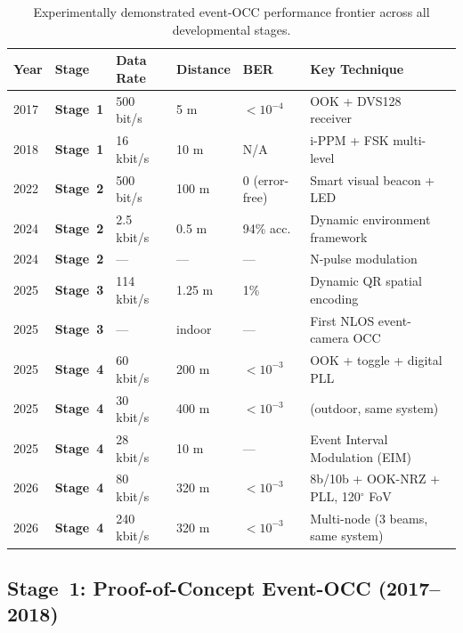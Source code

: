 \documentclass[10pt,a4paper]{article}
\newcommand{\stage}[1]{\textbf{Stage~#1}}
\begin{document}
\begin{table}[t]
\centering
\caption{Experimentally demonstrated event-OCC performance frontier across all developmental stages.}
\label{tab:frontier}
\small
\begin{tabularx}{\textwidth}{l l l l l X}
\toprule
\textbf{Year} & \textbf{Stage} & \textbf{Data Rate} & \textbf{Distance} & \textbf{BER} & \textbf{Key Technique} \\
\midrule
2017 & \stage{1} & 500 bit/s & 5 m & $<10^{-4}$ & OOK + DVS128 receiver~\cite{perez2017eventocc} \\
2018 & \stage{1} & 16 kbit/s & 10 m & N/A & i-PPM + FSK multi-level~\cite{shen2018eventocc} \\
2022 & \stage{2} & 500 bit/s & 100 m & 0 (error-free) & Smart visual beacon + LED~\cite{wang2022beacon} \\
2024 & \stage{2} & 2.5 kbit/s & 0.5 m & 94\% acc. & Dynamic environment framework~\cite{vonarnim2024dynamic} \\
2024 & \stage{2} & --- & --- & --- & N-pulse modulation~\cite{aranda2024npulse} \\
\midrule
2025 & \stage{3} & 114 kbit/s & 1.25 m & 1\% & Dynamic QR spatial encoding~\cite{su2025motionaware} \\
2025 & \stage{3} & --- & indoor & --- & First NLOS event-camera OCC~\cite{nishar2025nlosneuromorphic} \\
\midrule
2025 & \stage{4} & 60 kbit/s & 200 m & $<10^{-3}$ & OOK + toggle + digital PLL~\cite{sumino2025longrange} \\
2025 & \stage{4} & 30 kbit/s & 400 m & $<10^{-3}$ & (outdoor, same system)~\cite{sumino2025longrange} \\
2025 & \stage{4} & 28 kbit/s & 10 m & --- & Event Interval Modulation (EIM)~\cite{sumino2025eim} \\
2026 & \stage{4} & 80 kbit/s & 320 m & $<10^{-3}$ & 8b/10b + OOK-NRZ + PLL, 120$^\circ$ FoV~\cite{nardo2026longrange} \\
2026 & \stage{4} & 240 kbit/s & 320 m & $<10^{-3}$ & Multi-node (3 beams, same system)~\cite{nardo2026longrange} \\
\bottomrule
\end{tabularx}
\end{table}

\subsection{\stage{1}: Proof-of-Concept Event-OCC (2017--2018)}
\label{sec:stage1}
\end{document}
